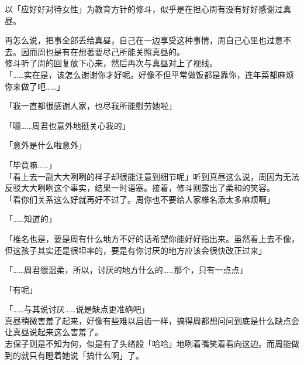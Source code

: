 以「应好好对待女性」为教育方针的修斗，似乎是在担心周有没有好好感谢过真昼。

再怎么说，把事全部丢给真昼，自己在一边享受这种事情，周自己心里也过意不去。因而周也是有在想著要尽己所能关照真昼的。\\

修斗听了周的回复放下心来，然后再次与真昼对上了视线。\\

「……实在是，该怎么谢谢你才好呢。好像不但平常做饭都是靠你，连年菜都麻烦你来做了吧……」

「我一直都很感谢人家，也尽我所能慰劳她啦」

「嗯……周君也意外地挺关心我的」

「意外是什么啦意外」

「毕竟嘛……」\\

「看上去一副大大咧咧的样子却很能注意到细节呢」听到真昼这么说，周因为无法反驳大大咧咧这个事实，结果一时语塞。接着，修斗则露出了柔和的笑容。\\

「看你们关系这么好就再好不过了。周你也不要给人家椎名添太多麻烦啊」

「……知道的」

「椎名也是，要是周有什么地方不好的话希望你能好好指出来。虽然看上去不像，但这孩子其实还是很坦率的，要是有你讨厌的地方应该会很快改正过来」

「……周君很温柔，所以，讨厌的地方什么的……那个，只有一点点」

「有呢」

「……与其说讨厌……说是缺点更准确吧」\\

真昼稍微害羞了起来，好像有些难以启齿一样，搞得周都想问问到底是什么缺点会让真昼说起来这么害羞了。\\

志保子则是不知为何，似是有了头绪般「哈哈」地咧着嘴笑着看向这边。而周能做到的就只有瞪着她说「搞什么啊」了。
